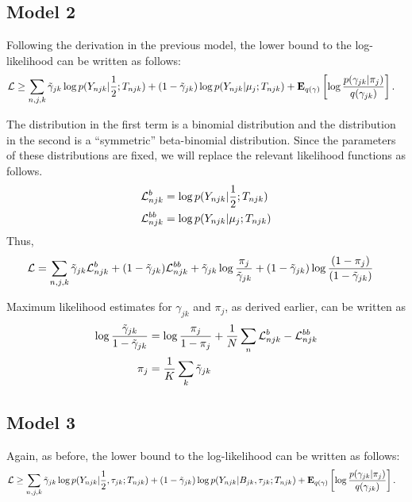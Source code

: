 \documentclass[reqno]{amsart}
\numberwithin{equation}{section}
\begin{document}
\subsection{Model 2}

Following the derivation in the previous model, the lower bound to the log-likelihood can be written as follows:
\begin{align}
    \likelihood
        &\geq \sum_{n,j,k} \gammav_{jk} \log p(Y_{njk} | \half; T_{njk}) + (1-\gammav_{jk}) \log p(Y_{njk} | \mu_j; T_{njk})
        + \expect{\log \frac{p(\gamma_{jk} | \pi_j)}{q(\gamma_{jk})}}{q(\gamma)}.
\end{align}

The distribution in the first term is a binomial distribution and the distribution in the second is a ``symmetric'' beta-binomial distribution.
Since the parameters of these distributions are fixed, we will replace the relevant likelihood functions as follows.
\begin{align}
    \likelihood^b_{njk} &= \log p(Y_{njk} | \half; T_{njk}) \\
    \likelihood^{bb}_{njk} &= \log p(Y_{njk} | \mu_j; T_{njk})
\end{align}
Thus,
\begin{align}
    \likelihood
        &= \sum_{n,j,k} \gammav_{jk} \likelihood^b_{njk} + (1-\gammav_{jk}) \likelihood^{bb}_{njk}
        + \gammav_{jk} \log \frac{\pi_j}{\gammav_{jk}} + (1-\gammav_{jk}) \log \frac{(1-\pi_j)}{(1-\gammav_{jk})}
\end{align}

Maximum likelihood estimates for $\gamma_{jk}$ and $\pi_j$, as derived earlier, can be written as
\begin{align}
    \log \frac{\gammav_{jk}}{1-\gammav_{jk}}
        &= \log \frac{\pi_j}{1-\pi_j} + \frac{1}{N} \sum_n \likelihood^b_{njk} - \likelihood^{bb}_{njk} \\
    \pi_j 
        &= \frac{1}{K} \sum_k \gammav_{jk}
\end{align}

\subsection{Model 3}

Again, as before, the lower bound to the log-likelihood can be written as follows:
\begin{align}
    \likelihood
        &\geq \sum_{n,j,k} \gammav_{jk} \log p(Y_{njk} | \half, \tau_{jk}; T_{njk}) + (1-\gammav_{jk}) \log p(Y_{njk} | B_{jk}, \tau_{jk}; T_{njk})
        + \expect{\log \frac{p(\gamma_{jk} | \pi_j)}{q(\gamma_{jk})}}{q(\gamma)}.
\end{align}
\end{document}
